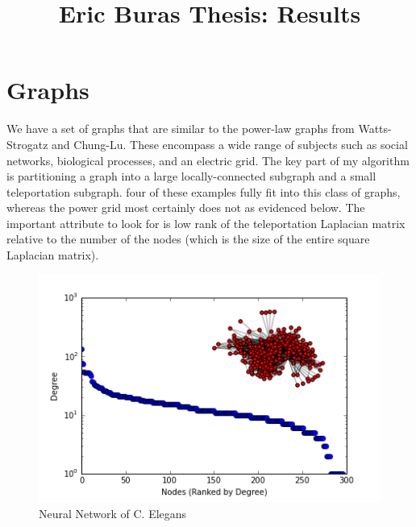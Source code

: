 \documentclass{article}
\begin{document}
\title{Eric Buras Thesis: Results}

\maketitle

\section{Graphs}
We have a set of graphs that are similar to the power-law graphs from Watts-Strogatz and Chung-Lu. These encompass a wide range of subjects such as social networks, biological processes, and an electric grid. The key part of my algorithm is partitioning a graph into a large locally-connected subgraph and a small teleportation subgraph. four of these examples fully fit into this class of graphs, whereas the power grid most certainly does not as evidenced below. The important attribute to look for is low rank of the teleportation Laplacian matrix relative to the number of the nodes (which is the size of the entire square Laplacian matrix).\\


\begin{figure}
\centering

\includegraphics[width=\linewidth]{neural_degree_histogram.png}
\caption{Neural Network of C. Elegans \cite{White:1986,Watts:1998}}
  
\end{figure}
\end{document}
